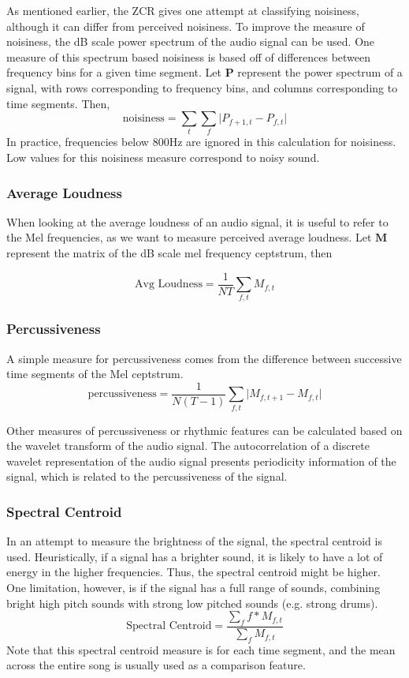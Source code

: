 \documentclass[12pt]{article}
\begin{document}
As mentioned earlier, the ZCR gives one attempt at classifying noisiness, although it can differ from perceived noisiness.  To improve the measure of noisiness, the dB scale power spectrum of the audio signal can be used.  One measure of this spectrum based noisiness is based off of differences between frequency bins for a given time segment.  Let $\mathbf{P}$ represent the power spectrum of a signal, with rows corresponding to frequency bins, and columns corresponding to time segments.  Then,
$$ \text{noisiness}  = \sum_{t} \sum_{f} \vert P_{f+1,t} - P_{f,t} \vert $$
In practice, frequencies below 800Hz are ignored in this calculation for noisiness.  Low values for this noisiness measure correspond to noisy sound.

\subsubsection{Average Loudness}

When looking at the average loudness of an audio signal, it is useful to refer to the Mel frequencies, as we want to measure perceived average loudness. Let $\mathbf{M}$ represent the matrix of the dB scale mel frequency ceptstrum, then

$$ \text{Avg Loudness} = \frac{1}{N T} \sum_{f,t} M_{f,t} $$

\subsubsection{Percussiveness}

A simple measure for percussiveness comes from the difference between successive time segments of the Mel ceptstrum.
$$ \text{percussiveness} = \frac{1}{N(T-1)} \sum_{f,t} \vert M_{f,t+1} - M_{f,t}  \vert $$

Other measures of percussiveness or rhythmic features can be calculated based on the wavelet transform of the audio signal.  The autocorrelation of a discrete wavelet representation of the audio signal presents periodicity information of the signal, which is related to the percussiveness of the signal.

\subsubsection{Spectral Centroid}

In an attempt to measure the brightness of the signal, the spectral centroid is used.  Heuristically, if a signal has a brighter sound, it is likely to have a lot of energy in the higher frequencies.  Thus, the spectral centroid might be higher.  One limitation, however, is if the signal has a full range of sounds, combining bright high pitch sounds with strong low pitched sounds (e.g. strong drums).
$$ \text{Spectral Centroid} = \frac{\sum_f f*M_{f,t}}{\sum_f M_{f,t}} $$
Note that this spectral centroid measure is for each time segment, and the mean across the entire song is usually used as a comparison feature.
\end{document}
